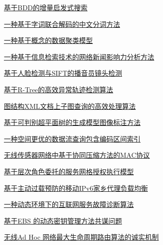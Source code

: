 \documentclass[a4paper]{article}
\begin{document}
\href{http://www.jos.org.cn/ch/reader/download_pdf.aspx?file_no=3563&year_id=2009&quarter_id=9&falg=1}{基于BDD的增量启发式搜索}

\href{http://www.jos.org.cn/ch/reader/download_pdf.aspx?file_no=3606&year_id=2009&quarter_id=9&falg=1}{一种基于字词联合解码的中文分词方法}

\href{http://www.jos.org.cn/ch/reader/download_pdf.aspx?file_no=3412&year_id=2009&quarter_id=9&falg=1}{一种基于概念的数据聚类模型}

\href{http://www.jos.org.cn/ch/reader/download_pdf.aspx?file_no=3434&year_id=2009&quarter_id=9&falg=1}{一种基于信息检索技术的网络新闻影响力分析方法}

\href{http://www.jos.org.cn/ch/reader/download_pdf.aspx?file_no=3461&year_id=2009&quarter_id=9&falg=1}{基于人脸检测与SIFT的播音员镜头检测}

\href{http://www.jos.org.cn/ch/reader/download_pdf.aspx?file_no=3580&year_id=2009&quarter_id=9&falg=1}{基于R-Tree的高效异常轨迹检测算法}

\href{http://www.jos.org.cn/ch/reader/download_pdf.aspx?file_no=3421&year_id=2009&quarter_id=9&falg=1}{图结构XML文档上子图查询的高效处理算法}

\href{http://www.jos.org.cn/ch/reader/download_pdf.aspx?file_no=3380&year_id=2009&quarter_id=9&falg=1}{基于可判别超平面树的生成模型图像标注方法}

\href{http://www.jos.org.cn/ch/reader/download_pdf.aspx?file_no=3402&year_id=2009&quarter_id=9&falg=1}{一种空间更优的数据流查询包含编码区间索引}

\href{http://www.jos.org.cn/ch/reader/download_pdf.aspx?file_no=3316&year_id=2009&quarter_id=9&falg=1}{无线传感器网络中基于协同压缩方法的MAC协议}

\href{http://www.jos.org.cn/ch/reader/download_pdf.aspx?file_no=3324&year_id=2009&quarter_id=9&falg=1}{基于层次角色委托的服务网格授权执行模型}

\href{http://www.jos.org.cn/ch/reader/download_pdf.aspx?file_no=3361&year_id=2009&quarter_id=9&falg=1}{基于主动过载预防的移动IPv6家乡代理负载均衡}

\href{http://www.jos.org.cn/ch/reader/download_pdf.aspx?file_no=3448&year_id=2009&quarter_id=9&falg=1}{一种动态环境下的互联网服务故障诊断算法}

\href{http://www.jos.org.cn/ch/reader/download_pdf.aspx?file_no=3366&year_id=2009&quarter_id=9&falg=1}{基于EBS 的动态密钥管理方法共谋问题}

\href{http://www.jos.org.cn/ch/reader/download_pdf.aspx?file_no=570&year_id=2009&quarter_id=9&falg=1}{无线Ad Hoc 网络最大生命周期路由算法的诚实机制}
\end{document}
